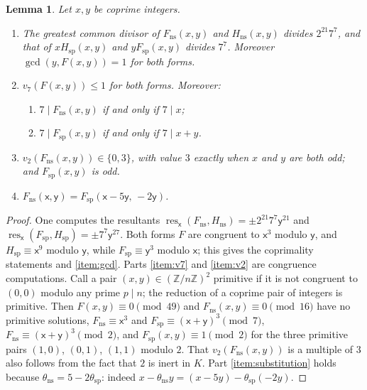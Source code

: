 \documentclass[12pt]{amsart}
\newcommand{\Z}{\mathbb{Z}}
\newcommand{\x}{\mathsf{x}}
\newcommand{\y}{\mathsf{y}}
\DeclareMathOperator{\ns}{ns}
\DeclareMathOperator{\spc}{sp}
\newcommand{\cdef}[1]{{\color{blue} \textsf{#1}}} %
\numberwithin{equation}{section}
\newtheorem{lemma}[theorem]{Lemma}
\theoremstyle{definition}
\begin{document}
\begin{lemma}
  \label{lem:arithmetic-of-forms}
  Let $x,y$ be coprime integers.
  \begin{enumerate}
  \item \label{item:gcd} The greatest common divisor of $F_{\ns}(x,y)$ and
    $H_{\ns}(x,y)$ divides $2^{21}7^{7}$, and that of $xH_{\spc}(x,y)$ and
    $yF_{\spc}(x,y)$ divides $7^{7}$. Moreover $\gcd(y,F(x,y)) = 1$ for both
    forms.
  \item \label{item:v7} $v_7(F(x,y)) \leq 1$ for both forms. Moreover:
    \begin{enumerate}
    \item \label{item:v7-ns} $7 \mid F_{\ns}(x,y)$ if and only if $7 \mid x$;
    \item \label{item:v7-sp} $7 \mid F_{\spc}(x,y)$ if and only if $7 \mid x+y$.
    \end{enumerate}
  \item \label{item:v2} $v_2(F_{\ns}(x,y)) \in \{0,3\}$, with value $3$ exactly
    when $x$ and $y$ are both odd; and $F_{\spc}(x,y)$ is odd.
  \item \label{item:substitution} $F_{\ns}(\x,\y) = F_{\spc}(\x-5\y,\,-2\y)$.
  \end{enumerate}
\end{lemma}
\begin{proof}
  One computes the resultants
  $\operatorname{res}_{\x}(F_{\ns},H_{\ns}) = \pm 2^{21}7^{7}\y^{21}$ and
  $\operatorname{res}_{\x}(F_{\spc},H_{\spc}) = \pm 7^{7}\y^{27}$. Both forms
  $F$ are congruent to $\x^{3}$ modulo $\y$, and $H_{\spc} \equiv \x^{9}$ modulo
  $\y$, while $F_{\spc} \equiv \y^{3}$ modulo $\x$; this gives the coprimality
  statements and \eqref{item:gcd}. Parts \eqref{item:v7} and \eqref{item:v2}
  are congruence computations. Call a pair $(x,y) \in (\Z/n\Z)^2$ \cdef{primitive}
  if it is not congruent to $(0,0)$ modulo any prime $p \mid n$; the reduction of
  a coprime pair of integers is primitive. Then $F(x,y) \equiv 0 \pmod{49}$ and
  $F_{\ns}(x,y) \equiv 0 \pmod{16}$ have no primitive solutions,
  $F_{\ns} \equiv \x^3$ and $F_{\spc} \equiv (\x+\y)^3 \pmod 7$,
  $F_{\ns} \equiv (\x+\y)^3 \pmod 2$, and $F_{\spc}(x,y) \equiv 1 \pmod 2$ for the three
  primitive pairs $(1,0)$, $(0,1)$, $(1,1)$ modulo $2$. That
  $v_2(F_{\ns}(x,y))$ is a multiple of $3$ also follows from the fact that $2$
  is inert in $K$. %
  Part \eqref{item:substitution} holds because
  $\theta_{\ns} = 5 - 2\theta_{\spc}$: indeed $x - \theta_{\ns}y = (x - 5y) - \theta_{\spc}(-2y)$.
\end{proof}
\end{document}
